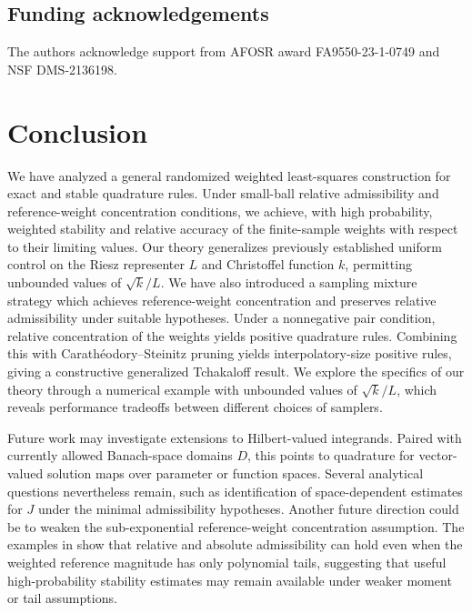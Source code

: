 \documentclass[10pt,dvipsnames]{amsart}
\begin{document}
\subsection{Funding acknowledgements}
The authors acknowledge support from AFOSR award FA9550-23-1-0749 and NSF DMS-2136198.


\section{Conclusion}
\label{sec:conclusion}

We have analyzed a general randomized weighted least-squares construction for
exact and stable quadrature rules. Under small-ball relative admissibility
and reference-weight concentration conditions, we achieve, with high
probability, weighted stability and relative accuracy of the finite-sample
weights with respect to their limiting values. Our theory generalizes previously established uniform control on the Riesz representer $L$ and Christoffel function $k$, permitting unbounded values of $\sqrt{k}/L$. We have also introduced a sampling mixture strategy which achieves reference-weight concentration and preserves relative admissibility under suitable hypotheses. Under a nonnegative pair condition, relative concentration of the weights yields positive quadrature rules. Combining this with Carath\'eodory--Steinitz pruning yields interpolatory-size positive rules, giving a constructive generalized Tchakaloff result. We explore the specifics of our theory through a numerical example with unbounded values of $\sqrt{k}/L$, which reveals performance tradeoffs between different choices of samplers.

Future work may investigate extensions to Hilbert-valued integrands. 
Paired with currently allowed Banach-space domains $D$, this points to quadrature for vector-valued solution maps over parameter or function spaces. 
Several analytical questions nevertheless remain, such as
identification of space-dependent estimates for \(J\) under the minimal admissibility hypotheses. 
Another future direction could be to weaken the sub-exponential reference-weight concentration assumption. The examples in  show that relative and absolute admissibility can hold even when the weighted reference magnitude has only polynomial tails, suggesting that useful high-probability stability estimates may remain available under weaker moment or tail assumptions.



\end{document}
